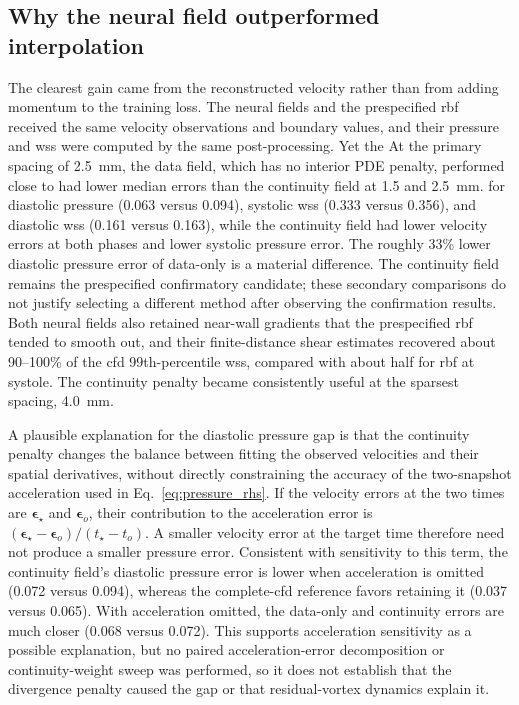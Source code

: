 \documentclass[12pt,a4paper]{article}
\newcommand{\CFD}{\ac{cfd}\xspace}
\newcommand{\WSS}{\ac{wss}\xspace}
\newcommand{\RBF}{\ac{rbf}\xspace}
\theoremstyle{definition}
\numberwithin{equation}{section}
\providecommand{\DIFaddtex}[1]{{\protect\color{blue} \sf #1}} %
\providecommand{\DIFdeltex}[1]{{\protect\color{red} \scriptsize #1}} %
\providecommand{\DIFaddbegin}{} %
\providecommand{\DIFaddend}{} %
\providecommand{\DIFdelbegin}{} %
\providecommand{\DIFdelend}{} %
\providecommand{\DIFadd}[1]{\texorpdfstring{\DIFaddtex{#1}}{#1}} %
\providecommand{\DIFdel}[1]{\texorpdfstring{\DIFdeltex{#1}}{}} %
\newcommand{\DIFscaledelfig}{0.5}
\newlength{\DIFdelgraphicswidth} %
\newlength{\DIFdelgraphicsheight} %
\newcommand{\DIFaddincludegraphics}[2][]{{\color{blue}\fbox{\DIFOincludegraphics[#1]{#2}}}} %
\newcommand{\DIFdelincludegraphics}[2][]{%
\sbox{\DIFdelgraphicsbox}{\DIFOincludegraphics[#1]{#2}}%
\settoboxwidth{\DIFdelgraphicswidth}{\DIFdelgraphicsbox} %
\settoboxtotalheight{\DIFdelgraphicsheight}{\DIFdelgraphicsbox} %
\scalebox{\DIFscaledelfig}{%
\parbox[b]{\DIFdelgraphicswidth}{\usebox{\DIFdelgraphicsbox}\\[-\baselineskip] \rule{\DIFdelgraphicswidth}{0em}}\llap{\resizebox{\DIFdelgraphicswidth}{\DIFdelgraphicsheight}{%
\setlength{\unitlength}{\DIFdelgraphicswidth}%
\begin{picture}(1,1)%
\thicklines\linethickness{2pt} %
{\color[rgb]{1,0,0}\put(0,0){\framebox(1,1){}}}%
{\color[rgb]{1,0,0}\put(0,0){\line( 1,1){1}}}%
{\color[rgb]{1,0,0}\put(0,1){\line(1,-1){1}}}%
\end{picture}%
}\hspace*{3pt}}} %
} %
\DeclareRobustCommand{\DIFaddbegin}{\DIFOaddbegin \let\includegraphics\DIFaddincludegraphics} %
\DeclareRobustCommand{\DIFaddend}{\DIFOaddend \let\includegraphics\DIFOincludegraphics} %
\DeclareRobustCommand{\DIFdelbegin}{\DIFOdelbegin \let\includegraphics\DIFdelincludegraphics} %
\DeclareRobustCommand{\DIFdelend}{\DIFOaddend \let\includegraphics\DIFOincludegraphics} %
\begin{document}
\subsection{Why the neural field outperformed interpolation}
The clearest gain came from the reconstructed velocity rather than from adding momentum to the training loss. The neural fields and the prespecified \RBF received the same velocity observations and boundary values, and their pressure and \WSS were computed by the same post-processing. \DIFdelbegin \DIFdel{Yet the }\DIFdelend \DIFaddbegin \DIFadd{At the primary spacing of 2.5~mm, the }\DIFaddend data field, which has no interior PDE penalty, \DIFdelbegin \DIFdel{performed close to }\DIFdelend \DIFaddbegin \DIFadd{had lower median errors than }\DIFaddend the continuity field \DIFdelbegin \DIFdel{at 1.5 and 2.5~mm. }\DIFdelend \DIFaddbegin \DIFadd{for diastolic pressure (0.063 versus 0.094), systolic }\WSS \DIFadd{(0.333 versus 0.356), and diastolic }\WSS \DIFadd{(0.161 versus 0.163), while the continuity field had lower velocity errors at both phases and lower systolic pressure error. The roughly 33\% lower diastolic pressure error of data-only is a material difference. The continuity field remains the prespecified confirmatory candidate; these secondary comparisons do not justify selecting a different method after observing the confirmation results. }\DIFaddend Both neural fields also retained near-wall gradients that the prespecified \RBF tended to smooth out, and their finite-distance shear estimates recovered about 90--100\% of the \CFD 99th-percentile \WSS, compared with about half for \RBF at systole. The continuity penalty became consistently useful at the sparsest spacing, 4.0~mm.

\DIFaddbegin \DIFadd{A plausible explanation for the diastolic pressure gap is that the continuity penalty changes the balance between fitting the observed velocities and their spatial derivatives, without directly constraining the accuracy of the two-snapshot acceleration used in Eq.~\eqref{eq:pressure_rhs}. If the velocity errors at the two times are $\boldsymbol\epsilon_\star$ and $\boldsymbol\epsilon_o$, their contribution to the acceleration error is $(\boldsymbol\epsilon_\star-\boldsymbol\epsilon_o)/(t_\star-t_o)$. A smaller velocity error at the target time therefore need not produce a smaller pressure error. Consistent with sensitivity to this term, the continuity field's diastolic pressure error is lower when acceleration is omitted (0.072 versus 0.094), whereas the complete-}\CFD \DIFadd{reference favors retaining it (0.037 versus 0.065). With acceleration omitted, the data-only and continuity errors are much closer (0.068 versus 0.072). This supports acceleration sensitivity as a possible explanation, but no paired acceleration-error decomposition or continuity-weight sweep was performed, so it does not establish that the divergence penalty caused the gap or that residual-vortex dynamics explain it.
}
\end{document}
